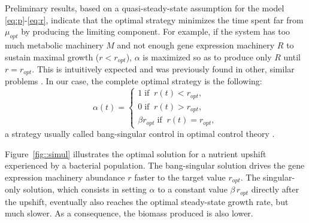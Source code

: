 \documentclass[10pt, conference]{ieeeconf}      %
\begin{document}
Preliminary results, based on a quasi-steady-state assumption for the model \eqref{eq:p}-\eqref{eq:r}, indicate that the optimal strategy minimizes the time spent far from $\mu_{opt}$ by producing the limiting component.
For example, if the system has too much metabolic machinery $M$ and not enough gene expression machinery $R$ to sustain maximal growth ($r < r_{opt}$), $\alpha$ is maximized so as to produce only $R$ until $r = r_{opt}$.
This is intuitively expected and was previously found in other, similar problems \cite{pavlov_optimal_2013,berg_optimal_1998, berg_optimal_2002}. In our case, the complete optimal strategy is the following:
\begin{equation}
\alpha(t) = 
\begin{cases}
1 \; \text{if} \;\; r(t)<r_{opt},\\
0 \; \text{if} \;\; r(t)>r_{opt},\\
\beta r_{opt} \; \text{if} \;\; r(t)=r_{opt},
\end{cases}
\label{optstrat}
\end{equation}
a strategy usually called bang-singular control in optimal control theory \cite{bryson_applied_1975}. 


Figure~\ref{fig::simul} illustrates the optimal solution for a nutrient upshift experienced by a bacterial population. The bang-singular solution drives the gene expression machinery abundance $r$ faster to the target value $r_{opt}$. The singular-only solution, which consists in setting $\alpha$ to a constant value $\beta \, r_{opt}$ directly after the upshift, eventually also reaches the optimal steady-state growth rate, but much slower. As a consequence, the biomass produced is also lower.
\end{document}
